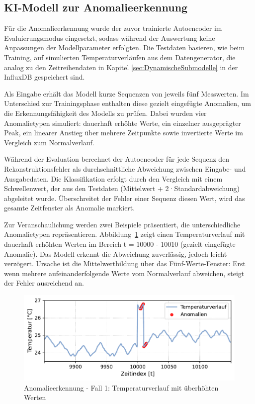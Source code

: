 \newpage
\subsection{KI-Modell zur Anomalieerkennung}

Für die Anomalieerkennung wurde der zuvor trainierte Autoencoder im Evaluierungsmodus eingesetzt, sodass während der Auswertung keine Anpassungen der Modellparameter erfolgten.
Die Testdaten basieren, wie beim Training, auf simulierten Temperaturverläufen aus dem Datengenerator, die analog zu den Zeitreihendaten in Kapitel \ref{sec:DynamischeSubmodelle} in der InfluxDB gespeichert sind.

Als Eingabe erhält das Modell kurze Sequenzen von jeweils fünf Messwerten.
Im Unterschied zur Trainingsphase enthalten diese gezielt eingefügte Anomalien, um die Erkennungsfähigkeit des Modells zu prüfen.
Dabei wurden vier Anomalietypen simuliert: dauerhaft erhöhte Werte, ein einzelner ausgeprägter Peak, ein linearer Anstieg über mehrere Zeitpunkte sowie invertierte Werte im Vergleich zum Normalverlauf.

Während der Evaluation berechnet der Autoencoder für jede Sequenz den Rekonstruktionsfehler als durchschnittliche Abweichung zwischen Eingabe- und Ausgabedaten. 
Die Klassifikation erfolgt durch den Vergleich mit einem Schwellenwert, der aus den Testdaten (Mittelwert + 2·Standardabweichung) abgeleitet wurde.
Überschreitet der Fehler einer Sequenz diesen Wert, wird das gesamte Zeitfenster als Anomalie markiert.

Zur Veranschaulichung werden zwei Beispiele präsentiert, die unterschiedliche Anomalietypen repräsentieren.
Abbildung~\ref{fig:Fall1} zeigt einen Temperaturverlauf mit dauerhaft erhöhten Werten im Bereich t = 10000 - 10010 (gezielt eingefügte Anomalie). 
Das Modell erkennt die Abweichung zuverlässig, jedoch leicht verzögert. 
Ursache ist die Mittelwertbildung über das Fünf-Werte-Fenster: Erst wenn mehrere aufeinanderfolgende Werte vom Normalverlauf abweichen, steigt der Fehler ausreichend an.


\vspace{-0.75em}
\begin{figure}[htbp]
    \centering
        \includegraphics[width=1\textwidth]{Bilder/Ergebnisse/KI/Fall1.pdf}
        \vspace{-2em}
    \caption[Anomalieerkennung - Fall 1]{Anomalieerkennung - Fall 1: Temperaturverlauf mit überhöhten Werten}
    \label{fig:Fall1}
\end{figure}
\vspace{-0.5em}

